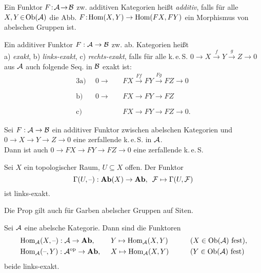 \documentclass{cheat-sheet}
\newcommand{\keS}{k.\,e.\,S.} %
\begin{document}
\begin{defn}
  Ein Funktor $F \!:\! \mathcal{A} \!\to\! \mathcal{B}$ zw. additiven Kategorien heißt \emph{additiv}, falls für alle $X, Y \!\in\! \operatorname{Ob}(\mathcal{A})$ die Abb. $F \!:\! \operatorname{Hom}(X, Y) \to \operatorname{Hom}(FX, FY)$ ein Morphismus von abelschen Gruppen ist.
\end{defn}


\begin{defn}
  Ein additiver Funktor $F : \mathcal{A} \to \mathcal{B}$ zw. ab. Kategorien heißt \\
  a) \emph{exakt}, b) \emph{links-exakt}, c) \emph{rechts-exakt}, falls für alle \keS{}
  $0 \to X \xrightarrow{f} Y \xrightarrow{g} Z \to 0$
  aus $\mathcal{A}$ auch folgende Seq. in $\mathcal{B}$ exakt ist:
  \begin{alignat*}{3}
    \text{a)} \enspace & 0 \to &&\, FX \xrightarrow{Ff} FY \xrightarrow{Fg} FZ \to 0 \\[-5pt]
    \text{b)} \enspace & 0 \to &&\, FX \xrightarrow{\phantom{Ff}} FY \xrightarrow{\phantom{Fg}} FZ \\[-5pt]
    \text{c)} \enspace & &&\, FX \xrightarrow{\phantom{Ff}} FY \xrightarrow{\phantom{Fg}} FZ \to 0.
  \end{alignat*}
\end{defn}

\begin{defn}
  Sei $F : \mathcal{A} \to \mathcal{B}$ ein additiver Funktor zwischen abelschen Kategorien und $0 \to X \to Y \to Z \to 0$ eine zerfallende \keS{} in $\mathcal{A}$. \\
  Dann ist auch $0 \to FX \to FY \to FZ \to 0$ eine zerfallende \keS{}
\end{defn}

\begin{prop}
  Sei $X$ ein topologischer Raum, $U \subseteq X$ offen. Der Funktor
  \[ \Gamma(U, \text{--}) : \mathbf{Ab}(X) \to \mathbf{Ab}, \enspace \mathcal{F} \mapsto \Gamma(U, \mathcal{F}) \]
  ist links-exakt.
\end{prop}

\begin{bem}
  Die Prop gilt auch für Garben abelscher Gruppen auf Siten.
\end{bem}

\begin{prop}
  Sei $\mathcal{A}$ eine abelsche Kategorie. Dann sind die Funktoren
  \begin{alignat*}{5}
    & \operatorname{Hom}_{\mathcal{A}}(X, \text{--}) : \mathcal{A} \to \mathbf{Ab}, \enspace && Y \mapsto \operatorname{Hom}_{\mathcal{A}}(X, Y) \qquad && \text{($X \in \operatorname{Ob}(\mathcal{A})$ fest)}, \\
    & \operatorname{Hom}_{\mathcal{A}}(\text{--}, Y) : \mathcal{A}^{\mathrm{op}} \to \mathbf{Ab}, \enspace && X \mapsto \operatorname{Hom}_{\mathcal{A}}(X, Y) \qquad && \text{($Y \in \operatorname{Ob}(\mathcal{A})$ fest)}
  \end{alignat*}
  beide links-exakt.
\end{prop}
\end{document}
